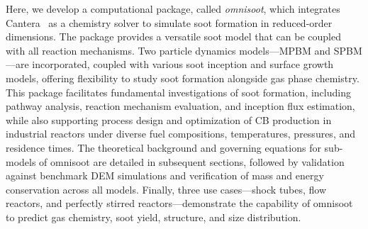 



Here, we develop a computational package, called \textit{omnisoot}, which integrates Cantera~\citep{cantera} as a chemistry solver to simulate soot formation in reduced-order dimensions. The package provides a versatile soot model that can be coupled with all reaction mechanisms. Two particle dynamics models—MPBM and SPBM—are incorporated, coupled with various soot inception and surface growth models, offering flexibility to study soot formation alongside gas phase chemistry. This package facilitates fundamental investigations of soot formation, including pathway analysis, reaction mechanism evaluation, and inception flux estimation, while also supporting process design and optimization of CB production in industrial reactors under diverse fuel compositions, temperatures, pressures, and residence times. The theoretical background and governing equations for sub-models of omnisoot are detailed in subsequent sections, followed by validation against benchmark DEM simulations and verification of mass and energy conservation across all models. Finally, three use cases—shock tubes, flow reactors, and perfectly stirred reactors—demonstrate the capability of omnisoot to predict gas chemistry, soot yield, structure, and size distribution.





